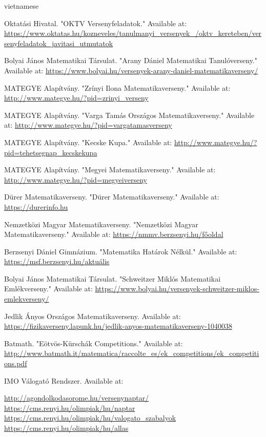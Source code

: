 \documentclass{article}
\begin{document}
\begin{otherlanguage*}{vietnamese}
\begin{thebibliography}{99}
 Oktatási Hivatal. "OKTV Versenyfeladatok." Available at: \url{https://www.oktatas.hu/kozneveles/tanulmanyi_versenyek_/oktv_kereteben/versenyfeladatok_javitasi_utmutatok}

 Bolyai János Matematikai Társulat. "Arany Dániel Matematikai Tanulóverseny." Available at: \url{https://www.bolyai.hu/versenyek-arany-daniel-matematikaverseny/}

 MATEGYE Alapítvány. "Zrínyi Ilona Matematikaverseny." Available at: \url{http://www.mategye.hu/?pid=zrinyi_verseny}

 MATEGYE Alapítvány. "Varga Tamás Országos Matematikaverseny." Available at: \url{http://www.mategye.hu/?pid=vargatamasverseny}

 MATEGYE Alapítvány. "Kecske Kupa." Available at: \url{http://www.mategye.hu/?pid=tehetsegnap_kecskekupa}

 MATEGYE Alapítvány. "Megyei Matematikaverseny." Available at: \url{http://www.mategye.hu/?pid=megyeiverseny}

 Dürer Matematikaverseny. "Dürer Matematikaverseny." Available at: \url{https://durerinfo.hu}

 Nemzetközi Magyar Matematikaverseny. "Nemzetközi Magyar Matematikaverseny." Available at: \url{https://nmmv.berzsenyi.hu/főoldal}

 Berzsenyi Dániel Gimnázium. "Matematika Határok Nélkül." Available at: \url{https://msf.berzsenyi.hu/aktuális}

 Bolyai János Matematikai Társulat. "Schweitzer Miklós Matematikai Emlékverseny." Available at: \url{https://www.bolyai.hu/versenyek-schweitzer-miklos-emlekverseny/}

 Jedlik Ányos Országos Matematikaverseny. Available at: \url{https://fizikaverseny.lapunk.hu/jedlik-anyos-matematikaverseny-1040038}

 Batmath. "Eötvös-Kürschák Competitions." Available at: \url{http://www.batmath.it/matematica/raccolte_es/ek_competitions/ek_competitions.pdf}

 IMO Válogató Rendszer. Available at:
\begin{itemize}
    \ii \url{http://agondolkodasorome.hu/versenynaptar/}
    \ii \url{https://cms.renyi.hu/olimpiak/hu/naptar}
    \ii \url{https://cms.renyi.hu/olimpiak/hu/valogato_szabalyok}
    \ii \url{https://cms.renyi.hu/olimpiak/hu/allas}
\end{itemize}


\end{thebibliography}
\end{otherlanguage*}
\end{document}
